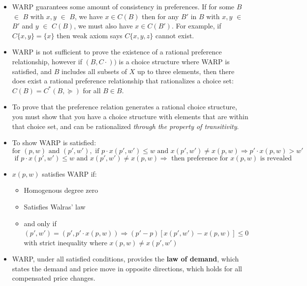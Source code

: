 \documentclass{article}
\begin{document}
\begin{itemize}
    \item WARP guarantees some amount of consistency in preferences. If for some $B$ $\in$ $B$ with $x,y$ $\in$ $B$, we have $x \in C(B)$ then for any $B'$ in $B$ with $x,y$ $\in$ $B'$ and $y$ $\in$ $C(B)$, we must also have $x \in C(B')$. For example, if $C\{x,y\} = \{x\}$ then weak axiom says $C\{x,y,z\}$ cannot exist. 
    \item WARP is not sufficient to prove the existence of a rational preference relationship, however if $(B, C\cdot))$ is a choice structure where WARP is satisfied, and $B$ includes all subsets of $X$ up to three elements, then there does exist a rational preference relationship that rationalizes a choice set: $C(B) = C^*(B, \succeq)$ for all $B \in B$.
    \item To prove that the preference relation generates a rational choice structure, you must show that you have a choice structure with elements that are within that choice set, and can be rationalized \textit{through the property of transitivity}.
    \item To show WARP is satisfied:\label{WARP} 
    \[
    \text{for } (p,w) \text{ and } (p',w'), \text{ if } p \cdot x(p', w') \leq w \text{ and }  x(p', w') \neq x(p,w) \Rightarrow p' \cdot x(p,w) > w'
    \]
    \[
    \text{ if } p \cdot x(p', w') \leq w \text{ and }  x(p', w') \neq x(p,w) \Rightarrow \text{ then preference for } x(p,w) \text{ is revealed } 
    \]
    \item $x(p,w)$ satisfies WARP if:
        \begin{itemize}
            \item Homogenous degree zero
            \item Satisfies Walras' law
            \item and only if $(p', w') = (p', p' \cdot x(p,w)) \Rightarrow (p'-p)[x(p', w') - x(p,w)] \leq 0$ with strict inequality where $x(p,w) \neq x(p', w')$
        \end{itemize}
    \item WARP, under all satisfied conditions, provides the \textbf{law of demand}, which states the demand and price move in opposite directions, which holds for all compensated price changes. 
    \end{itemize}
    
\end{document}
